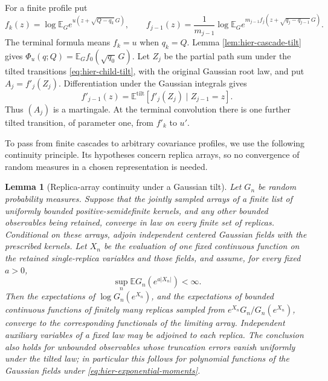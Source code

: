 \documentclass[11pt,a4paper]{article}
\numberwithin{equation}{section}
\newtheorem{lemma}[theorem]{Lemma}
\theoremstyle{definition}
\theoremstyle{remark}
\newcommand{\E}{\mathbb E}
\begin{document}
For a finite profile put
\[
 f_k(z)=\log\E_G e^{u(z+\sqrt{Q-q_k}\,G)},\qquad
 f_{j-1}(z)=\frac1{m_{j-1}}\log\E_G
 e^{m_{j-1}f_j(z+\sqrt{q_j-q_{j-1}}\,G)}.
\]
The terminal formula means $f_k=u$ when $q_k=Q$.  Lemma
\ref{lem:hier-cascade-tilt} gives
$\Phi_u(q;Q)=\E_G f_0(\sqrt{q_0}\,G)$.
Let $Z_j$ be the partial path sum under the tilted transitions
\eqref{eq:hier-child-tilt}, with the original Gaussian root law, and put
$A_j=f'_j(Z_j)$.  Differentiation under the Gaussian integrals gives
\[
 f'_{j-1}(z)=
 \E^{\mathrm{tilt}}[f'_j(Z_j)\mid Z_{j-1}=z].
\]
Thus $(A_j)$ is a martingale.  At the terminal convolution there is one
further tilted transition, of parameter one, from $f'_k$ to $u'$.

To pass from finite cascades to arbitrary covariance profiles, we use the
following continuity principle.  Its hypotheses concern replica arrays,
so no convergence of random measures in a chosen representation is needed.

\begin{lemma}[Replica-array continuity under a Gaussian tilt]
\label{lem:hier-array-continuity}
Let $G_n$ be random probability measures.  Suppose that the jointly sampled
arrays of a finite list of uniformly bounded positive-semidefinite kernels,
and any other bounded observables being retained, converge in law on every
finite set of replicas.  Conditional on these arrays, adjoin independent
centered Gaussian fields with the prescribed kernels.  Let $X_n$ be the
evaluation of one fixed continuous function on the retained single-replica
variables and those fields, and assume, for every fixed $a>0$,
\begin{equation}
 \sup_n\E G_n(e^{a|X_n|})<\infty.
 \label{eq:hier-exponential-moments}
\end{equation}
Then the expectations of $\log G_n(e^{X_n})$, and the expectations of bounded
continuous functions of finitely many replicas sampled from
$e^{X_n}G_n/G_n(e^{X_n})$, converge to the corresponding functionals of the
limiting array.  Independent auxiliary variables of a fixed law may be
adjoined to each replica.  The conclusion also holds for unbounded
observables whose truncation errors vanish uniformly under the tilted law;
in particular this follows for polynomial functions of the Gaussian fields
under \eqref{eq:hier-exponential-moments}.
\end{lemma}
\end{document}
